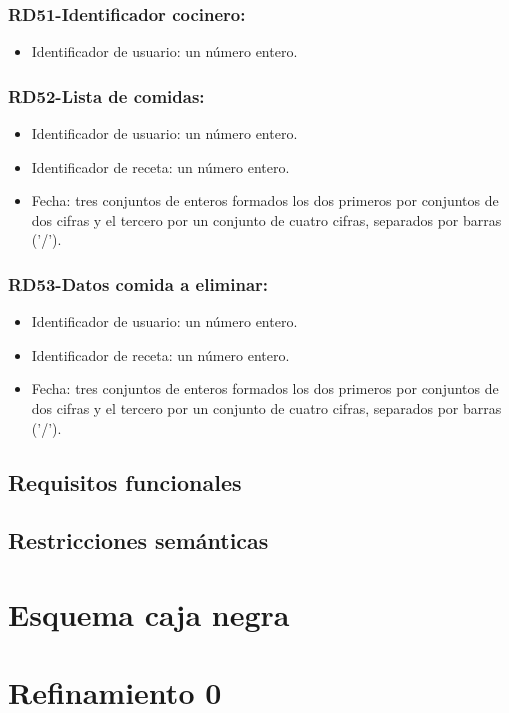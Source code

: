 \documentclass[a4paper,12pt]{report}
\begin{document}
\subsection{RD51-Identificador cocinero:}
\label{sec-2-1-51}
\begin{itemize}
\item Identificador de usuario: un número entero.
\end{itemize}
\subsection{RD52-Lista de comidas:}
\label{sec-2-1-52}
\begin{itemize}
\item Identificador de usuario: un número entero.
\item Identificador de receta: un número entero.
\item Fecha: tres conjuntos de enteros formados los dos primeros por
conjuntos de dos cifras y el tercero por un conjunto de cuatro
cifras, separados por barras ('/').
\end{itemize}
\subsection{RD53-Datos comida a eliminar:}
\label{sec-2-1-53}
\begin{itemize}
\item Identificador de usuario: un número entero.
\item Identificador de receta: un número entero.
\item Fecha: tres conjuntos de enteros formados los dos primeros por
conjuntos de dos cifras y el tercero por un conjunto de cuatro
cifras, separados por barras ('/').
\end{itemize}

\section{Requisitos funcionales}
\label{sec-2-2}
\section{Restricciones semánticas}
\label{sec-2-3}
\chapter{Esquema caja negra}
\label{sec-3}
\chapter{Refinamiento 0}
\label{sec-4}
\end{document}
